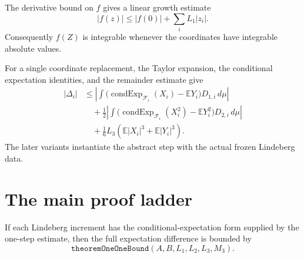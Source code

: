 \begin{lemma}\label{lem:interpolated-integrability}
\leanok
The derivative bound on \(f\) gives a linear growth estimate
\[
  |f(z)|\le |f(0)|+\sum_i L_1|z_i|.
\]
Consequently \(f(Z)\) is integrable whenever the coordinates have integrable
absolute values.
\end{lemma}

\begin{theorem}\label{thm:one-step-estimate}
\leanok
For a single coordinate replacement, the Taylor expansion, the conditional
expectation identities, and the remainder estimate give
\[
\begin{aligned}
  |\Delta_i|
  &\le
  \left|\int
    \bigl(\operatorname{condExp}_{\mathcal F_i}(X_i)-\mathbb E Y_i\bigr)
    D_{1,i}\,d\mu\right| \\
  &\quad+\frac12
  \left|\int
    \bigl(\operatorname{condExp}_{\mathcal F_i}(X_i^2)-\mathbb E Y_i^2\bigr)
    D_{2,i}\,d\mu\right| \\
  &\quad+\frac16L_3
  \left(\mathbb E|X_i|^3+\mathbb E|Y_i|^3\right).
\end{aligned}
\]
The later variants instantiate the abstract step with the actual frozen
Lindeberg data.
\end{theorem}

\section{The main proof ladder}

\begin{theorem}\label{thm:probabilistic-summation}
\leanok
If each Lindeberg increment has the conditional-expectation form supplied by
the one-step estimate, then the full expectation difference is bounded by
\[
  \texttt{theoremOneOneBound}(A,B,L_1,L_2,L_3,M_3).
\]
\end{theorem}

